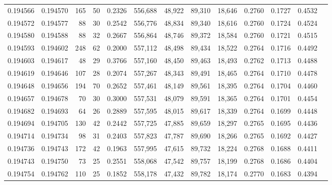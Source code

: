 \begin{tabular}{rrrrrrrrrrrrr}
0.194566 & 0.194570 &   165 &  50 &                                     0.2326 & 556,688 &  48,922 &  89,310 &  18,646 & 0.2760 & 0.1727 & 0.4532 \\
0.194572 & 0.194577 &    88 &  30 &                                     0.2542 & 556,776 &  48,834 &  89,340 &  18,616 & 0.2760 & 0.1724 & 0.4524 \\
0.194580 & 0.194588 &    88 &  32 &                                     0.2667 & 556,864 &  48,746 &  89,372 &  18,584 & 0.2760 & 0.1721 & 0.4515 \\
0.194593 & 0.194602 &   248 &  62 &                                     0.2000 & 557,112 &  48,498 &  89,434 &  18,522 & 0.2764 & 0.1716 & 0.4492 \\
0.194603 & 0.194617 &    48 &  29 &                                     0.3766 & 557,160 &  48,450 &  89,463 &  18,493 & 0.2762 & 0.1713 & 0.4488 \\
0.194619 & 0.194646 &   107 &  28 &                                     0.2074 & 557,267 &  48,343 &  89,491 &  18,465 & 0.2764 & 0.1710 & 0.4478 \\
0.194648 & 0.194656 &   194 &  70 &                                     0.2652 & 557,461 &  48,149 &  89,561 &  18,395 & 0.2764 & 0.1704 & 0.4460 \\
0.194657 & 0.194678 &    70 &  30 &                                     0.3000 & 557,531 &  48,079 &  89,591 &  18,365 & 0.2764 & 0.1701 & 0.4454 \\
0.194682 & 0.194693 &    64 &  26 &                                     0.2889 & 557,595 &  48,015 &  89,617 &  18,339 & 0.2764 & 0.1699 & 0.4448 \\
0.194694 & 0.194705 &   130 &  42 &                                     0.2442 & 557,725 &  47,885 &  89,659 &  18,297 & 0.2765 & 0.1695 & 0.4436 \\
0.194714 & 0.194734 &    98 &  31 &                                     0.2403 & 557,823 &  47,787 &  89,690 &  18,266 & 0.2765 & 0.1692 & 0.4427 \\
0.194736 & 0.194743 &   172 &  42 &                                     0.1963 & 557,995 &  47,615 &  89,732 &  18,224 & 0.2768 & 0.1688 & 0.4411 \\
0.194743 & 0.194750 &    73 &  25 &                                     0.2551 & 558,068 &  47,542 &  89,757 &  18,199 & 0.2768 & 0.1686 & 0.4404 \\
0.194754 & 0.194762 &   110 &  25 &                                     0.1852 & 558,178 &  47,432 &  89,782 &  18,174 & 0.2770 & 0.1683 & 0.4394 \\

\end{tabular}
